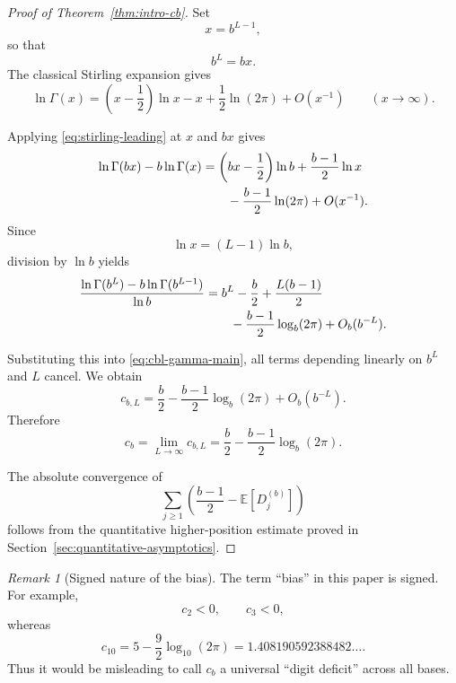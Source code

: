 \documentclass[11pt]{article}
\theoremstyle{definition}
\theoremstyle{remark}
\newtheorem*{remark}{Remark}
\begin{document}
\begin{proof}[Proof of Theorem~\ref{thm:intro-cb}]
Set
\[
    x=b^{L-1},
\]
so that
\[
    b^L=bx.
\]
The classical Stirling expansion gives
\begin{equation}
    \ln\Gamma(x)
    =
    \left(x-\frac12\right)\ln x
    -
    x
    +
    \frac12\ln(2\pi)
    +
    O(x^{-1})
    \qquad
    (x\to\infty).
    \label{eq:stirling-leading}
\end{equation}

Applying \eqref{eq:stirling-leading} at \(x\) and \(bx\) gives
\begin{align}
    \ln\Gamma(bx)-b\ln\Gamma(x)
    &=
    \left(bx-\frac12\right)\ln b
    +
    \frac{b-1}{2}\ln x
    \notag\\
    &\qquad
    -
    \frac{b-1}{2}\ln(2\pi)
    +
    O(x^{-1}).
    \label{eq:gamma-difference-stirling}
\end{align}
Since
\[
    \ln x=(L-1)\ln b,
\]
division by \(\ln b\) yields
\begin{align}
    \frac{
        \ln\Gamma(b^L)
        -
        b\ln\Gamma(b^{L-1})
    }{\ln b}
    &=
    b^L
    -
    \frac{b}{2}
    +
    \frac{L(b-1)}{2}
    \notag\\
    &\qquad
    -
    \frac{b-1}{2}\log_b(2\pi)
    +
    O_b(b^{-L}).
    \label{eq:gamma-difference-final}
\end{align}

Substituting this into
\eqref{eq:cbl-gamma-main}, all terms depending linearly on
\(b^L\) and \(L\) cancel.  We obtain
\begin{equation}
    c_{b,L}
    =
    \frac{b}{2}
    -
    \frac{b-1}{2}\log_b(2\pi)
    +
    O_b(b^{-L}).
    \label{eq:cbl-leading-limit}
\end{equation}
Therefore
\begin{equation}
\boxed{
    c_b
    =
    \lim_{L\to\infty}c_{b,L}
    =
    \frac{b}{2}
    -
    \frac{b-1}{2}\log_b(2\pi).
}
\label{eq:cb-main}
\end{equation}

The absolute convergence of
\[
    \sum_{j\ge1}
    \left(
        \frac{b-1}{2}
        -
        \mathbb E[D_j^{(b)}]
    \right)
\]
follows from the quantitative higher-position estimate proved in
Section~\ref{sec:quantitative-asymptotics}.
\end{proof}

\begin{remark}[Signed nature of the bias]
\label{rem:signed-bias}
The term ``bias'' in this paper is signed.
For example,
\[
    c_2<0,
    \qquad
    c_3<0,
\]
whereas
\[
    c_{10}
    =
    5-\frac92\log_{10}(2\pi)
    =
    1.408190592388482\ldots.
\]
Thus it would be misleading to call \(c_b\) a universal
``digit deficit'' across all bases.
\end{remark}
\end{document}

